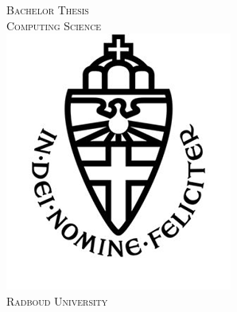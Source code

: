 \documentclass{report}
\begin{document}


\begin{titlepage}

\newcommand{\HRule}{\rule{\linewidth}{0.5mm}} %

\center %
 

\textsc{\LARGE Bachelor Thesis\\Computing Science}\\[1.5cm] %
\includegraphics[scale=.35]{radboud_logo.png}\\[1cm] %
\textsc{\Large Radboud University}\\[0.5cm] %



\end{titlepage}
\end{document}
